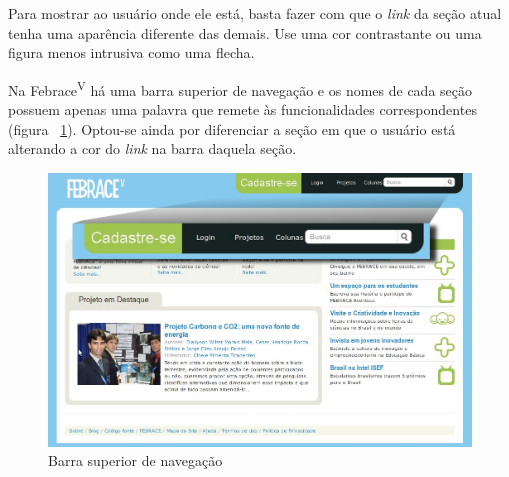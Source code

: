 Para mostrar ao usuário onde ele está, basta fazer com que o \textit{link} da seção atual tenha uma aparência diferente das demais. Use uma cor contrastante ou uma figura menos intrusiva como uma flecha.

Na Febrace\textsuperscript{V} há uma barra superior de navegação e os nomes de cada seção possuem apenas uma palavra que remete às funcionalidades correspondentes (figura ~\ref{home}). Optou-se ainda por diferenciar a seção em que o usuário está alterando a cor do \textit{link} na barra daquela seção. 

    \begin{figure}[h]
        \begin{center}
    \includegraphics[width=1.0\linewidth]{arquivos/superior_bar.png}
        \end{center}
        \caption{Barra superior de navegação}
        \label{home}
    \end{figure}

